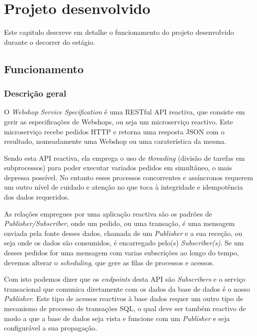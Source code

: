 \chapter{Projeto desenvolvido}\label{cap5}

Este capitulo descreve em detalhe o funcionamento do projeto desenvolvido durante o decorrer do estágio.

\section{Funcionamento}

\subsection{Descrição geral}

O \textit{Webshop Service Specification} é uma RESTful API reactiva, que consiste em gerir as especificações de Webshops, ou seja um microserviço reactivo. Este microserviço recebe pedidos HTTP e retorna uma resposta JSON com o resultado, nomeadamente uma Webshop ou uma caraterística da mesma.

Sendo esta API reactiva, ela emprega o uso de \textit{threading} (divisão de tarefas em subprocessos) para poder executar variados pedidos em simultâneo, o mais depressa possível. No entanto esses processos concorrentes e assíncronos requerem um outro nível de cuidado e atenção no que toca à integridade e idempotência dos dados requeridos.

As relações empregues por uma aplicação reactiva são os padrões de \textit{Publisher/Subscriber}, onde um pedido, ou uma transação, é uma mensagem enviada pela fonte desses dados, chamada de um \textit{Publisher} e a sua receção, ou seja onde os dados são consumidos, é encarregado pelo(s) \textit{Subscriber(s)}. Se um desses pedidos for uma mensagem com varias subscrições ao longo do tempo, devemos alterar o \textit{scheduling}, que gere as filas de processos e acessos.

Com isto podemos dizer que os \textit{endpoints} desta API são \textit{Subscribers} e o serviço transacional que comunica diretamente com os dados da base de dados é o nosso \textit{Publisher}. Este tipo de acessos reactivos à base dados requer um outro tipo de mecanismo de processo de transações SQL, o qual deve ser também reactivo de modo a que a base de dados seja vista e funcione com um \textit{Publisher} e seja configurável a sua propagação.

\newpage


